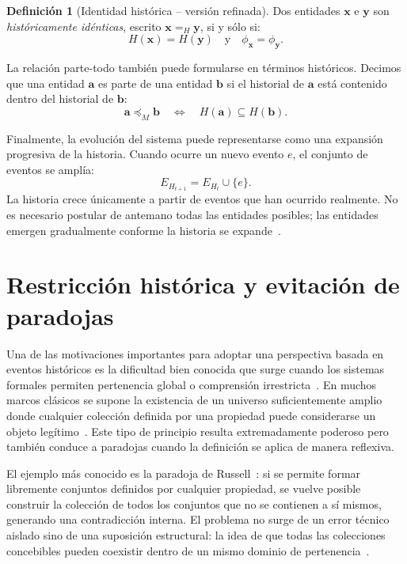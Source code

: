 \documentclass[12pt]{article}
\theoremstyle{plain}
\theoremstyle{definition}
\newtheorem{definition}[theorem]{Definición}
\begin{document}
\begin{definition}[Identidad histórica -- versión refinada]
\label{def:identidad_refinada}
Dos entidades $\mathbf{x}$ e $\mathbf{y}$ son \emph{históricamente idénticas}, escrito $\mathbf{x} =_H \mathbf{y}$, si y sólo si:
\[
H(\mathbf{x}) = H(\mathbf{y}) \quad\text{y}\quad \phi_{\mathbf{x}} = \phi_{\mathbf{y}}.
\]
\end{definition}

La relación parte-todo también puede formularse en términos históricos. Decimos que una entidad $\mathbf{a}$ es parte de una entidad $\mathbf{b}$ si el historial de $\mathbf{a}$ está contenido dentro del historial de $\mathbf{b}$:
\[
\mathbf{a} \preceq_M \mathbf{b} \quad\Longleftrightarrow\quad H(\mathbf{a}) \subseteq H(\mathbf{b}).
\]

Finalmente, la evolución del sistema puede representarse como una expansión progresiva de la historia. Cuando ocurre un nuevo evento $e$, el conjunto de eventos se amplía:
\[
E_{H_{t+1}} = E_{H_t} \cup \{e\}.
\]
La historia crece únicamente a partir de eventos que han ocurrido realmente. No es necesario postular de antemano todas las entidades posibles; las entidades emergen gradualmente conforme la historia se expande~\cite{fowler,kleppmann}.

\section{Restricción histórica y evitación de paradojas}
\label{sec:paradojas}

Una de las motivaciones importantes para adoptar una perspectiva basada en eventos históricos es la dificultad bien conocida que surge cuando los sistemas formales permiten pertenencia global o comprensión irrestricta~\cite{russellparadox,zermelo}. En muchos marcos clásicos se supone la existencia de un universo suficientemente amplio donde cualquier colección definida por una propiedad puede considerarse un objeto legítimo~\cite{frege}. Este tipo de principio resulta extremadamente poderoso pero también conduce a paradojas cuando la definición se aplica de manera reflexiva.

El ejemplo más conocido es la paradoja de Russell~\cite{russellparadox}: si se permite formar libremente conjuntos definidos por cualquier propiedad, se vuelve posible construir la colección de todos los conjuntos que no se contienen a sí mismos, generando una contradicción interna. El problema no surge de un error técnico aislado sino de una suposición estructural: la idea de que todas las colecciones concebibles pueden coexistir dentro de un mismo dominio de pertenencia~\cite{zermelo,vonneumann}.
\end{document}
